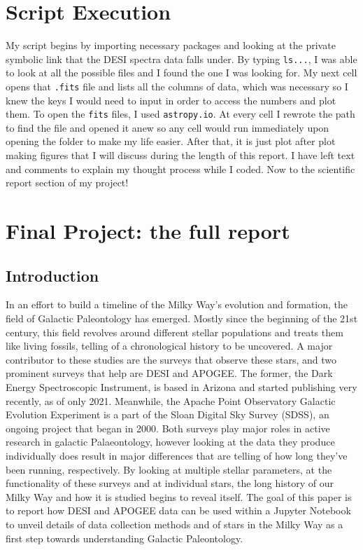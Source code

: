 \documentclass{article}
\begin{document}
\section*{Script Execution}
My script begins by importing necessary packages and looking at the private symbolic link that the DESI spectra data falls under. By typing \texttt{ls...}, I was able to look at all the possible files and I found the one I was looking for. My next cell opens that \texttt{.fits} file and lists all the columns of data, which was necessary so I knew the keys I would need to input in order to access the numbers and plot them. To open the \texttt{fits} files, I used \texttt{astropy.io}. At every cell I rewrote the path to find the file and opened it anew so any cell would run immediately upon opening the folder to make my life easier. After that, it is just plot after plot making figures that I will discuss during the length of this report. I have left text and comments to explain my thought process while I coded. Now to the scientific report section of my project!\\

\section*{Final Project: the full report}
\subsection*{Introduction}
\indent In an effort to build a timeline of the Milky Way’s evolution and formation, the field of Galactic Paleontology has emerged. Mostly since the beginning of the 21st century, this field revolves around different stellar populations and treats them like living fossils, telling of a chronological history to be uncovered. A major contributor to these studies are the surveys that observe these stars, and two prominent surveys that help are DESI and APOGEE. The former, the Dark Energy Spectroscopic Instrument, is based in Arizona and started publishing very recently, as of only 2021. Meanwhile, the Apache Point Observatory Galactic Evolution Experiment is a part of the Sloan Digital Sky Survey (SDSS), an ongoing project that began in 2000. Both surveys play major roles in active research in galactic Palaeontology, however looking at the data they produce individually does result in major differences that are telling of how long they’ve been running, respectively. By looking at multiple stellar parameters, at the functionality of these surveys and at individual stars, the long history of our Milky Way and how it is studied begins to reveal itself. The goal of this paper is to report how DESI and APOGEE data can be used within a Jupyter Notebook to unveil details of data collection methods and of stars in the Milky Way as a first step towards understanding Galactic Paleontology. 
\end{document}
